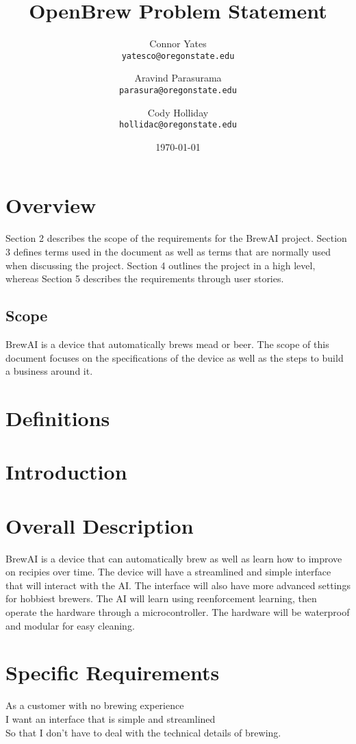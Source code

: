 \documentclass[letterpaper,10pt]{article}
\author{Connor Yates\\
\texttt{yatesco@oregonstate.edu}
\and
Aravind Parasurama\\
\texttt{parasura@oregonstate.edu}
\and
Cody Holliday\\
\texttt{hollidac@oregonstate.edu}}
\date{\today}
\title{OpenBrew Problem Statement}
\begin{document}
\maketitle

\newpage

\section{Overview}
Section 2 describes the scope of the requirements for the BrewAI project.
Section 3 defines terms used in the document as well as terms that are normally used when discussing the project.
Section 4 outlines the project in a high level, whereas Section 5 describes the requirements through user stories.

\subsection{Scope}
BrewAI is a device that automatically brews mead or beer.
The scope of this document focuses on the specifications of the device as well as the steps to build a business around it.


\section{Definitions}

\section{Introduction}
\section{Overall Description}
BrewAI is a device that can automatically brew as well as learn how to improve on recipies over time.
The device will have a streamlined and simple interface that will interact with the AI.
The interface will also have more advanced settings for hobbiest brewers.
The AI will learn using reenforcement learning, then operate the hardware through a microcontroller.
The hardware will be waterproof and modular for easy cleaning.

\section{Specific Requirements}
As a customer with no brewing experience\\
I want an interface that is simple and streamlined\\
So that I don't have to deal with the technical details of brewing.\\
\end{document}
